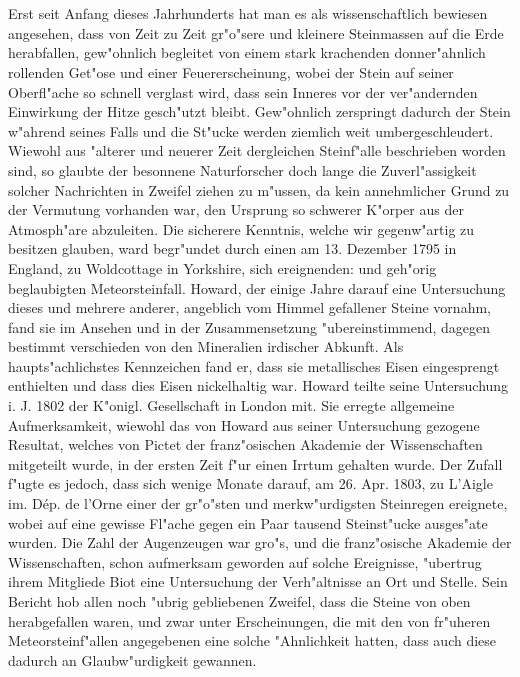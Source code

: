 \documentclass[a4paper, 11pt, oneside]{article}
\begin{document}
\setlength{\parskip}{1mm plus1mm minus1mm}
\clearpage
\pagestyle{fancy}
\fancyhf{}
\cfoot{\frakfamily{\thepage}}
\tableofcontents
\clearpage
\LARGE
\section*{}
\paragraph{}
Erst seit Anfang dieses Jahrhunderts hat man es als wissenschaftlich bewiesen angesehen, dass von Zeit zu Zeit gr"o"sere und kleinere Steinmassen auf die Erde herabfallen, gew"ohnlich begleitet von einem stark krachenden donner"ahnlich rollenden Get"ose und einer Feuererscheinung, wobei der Stein auf seiner Oberfl"ache so schnell verglast wird, dass sein Inneres vor der ver"andernden Einwirkung der Hitze gesch"utzt bleibt. Gew"ohnlich zerspringt dadurch der Stein w"ahrend seines Falls und die St"ucke werden ziemlich weit umbergeschleudert. Wiewohl aus "alterer und neuerer Zeit dergleichen Steinf"alle beschrieben worden sind, so glaubte der besonnene Naturforscher doch lange die Zuverl"assigkeit solcher Nachrichten in Zweifel ziehen zu m"ussen, da kein annehmlicher Grund zu der Vermutung vorhanden war, den Ursprung so schwerer K"orper aus der Atmosph"are abzuleiten. Die sicherere Kenntnis, welche wir gegenw"artig zu besitzen glauben, ward begr"undet durch einen am 13. Dezember 1795 in England, zu Woldcottage in Yorkshire, sich ereignenden: und geh"orig beglaubigten Meteorsteinfall. Howard, der einige Jahre darauf eine Untersuchung dieses und mehrere anderer, angeblich vom Himmel gefallener Steine vornahm, fand sie im Ansehen und in der Zusammensetzung "ubereinstimmend, dagegen bestimmt verschieden von den Mineralien irdischer Abkunft. Als haupts"achlichstes Kennzeichen fand er, dass sie metallisches Eisen eingesprengt enthielten und dass dies Eisen nickelhaltig war. Howard teilte seine Untersuchung i. J. 1802 der K"onigl. Gesellschaft in London mit. Sie erregte allgemeine Aufmerksamkeit, wiewohl das von Howard aus seiner Untersuchung gezogene Resultat, welches von Pictet der franz"osischen Akademie der Wissenschaften mitgeteilt wurde, in der ersten Zeit f"ur einen Irrtum gehalten wurde. Der Zufall f"ugte es jedoch, dass sich wenige Monate darauf, am 26. Apr. 1803, zu L'Aigle im. Dép. de l’Orne einer der gr"o"sten und merkw"urdigsten Steinregen ereignete, wobei auf eine gewisse Fl"ache gegen ein Paar tausend Steinst"ucke ausges"ate wurden. Die Zahl der Augenzeugen war gro"s, und die franz"osische Akademie der Wissenschaften, schon aufmerksam geworden auf solche Ereignisse, "ubertrug ihrem Mitgliede Biot eine Untersuchung der Verh"altnisse an Ort und Stelle. Sein Bericht hob allen noch "ubrig gebliebenen Zweifel, dass die Steine von oben herabgefallen waren, und zwar unter Erscheinungen, die mit den von fr"uheren Meteorsteinf"allen angegebenen eine solche "Ahnlichkeit hatten, dass auch diese dadurch an Glaubw"urdigkeit gewannen.
\end{document}
